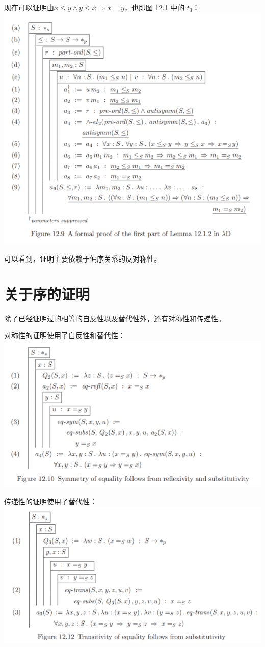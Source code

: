 \documentclass[UTF8]{article}
\begin{document}
		现在可以证明由$x\le y\land y\le x\Rightarrow x=y$，也即图 12.1 中的 $t_3$：\\
		\includegraphics[width=0.93\linewidth]{"../imgs/12-8.png"}
		
		可以看到，证明主要依赖于偏序关系的反对称性。
		
	\section{关于序的证明}
	\noindent
	除了已经证明过的相等的自反性以及替代性外，还有对称性和传递性。
	
		对称性的证明使用了自反性和替代性：\\
		\includegraphics[width=0.93\linewidth]{"../imgs/12-9.png"}
		
		传递性的证明使用了替代性：\\
		\includegraphics[width=0.93\linewidth]{"../imgs/12-10.png"}
\end{document}
